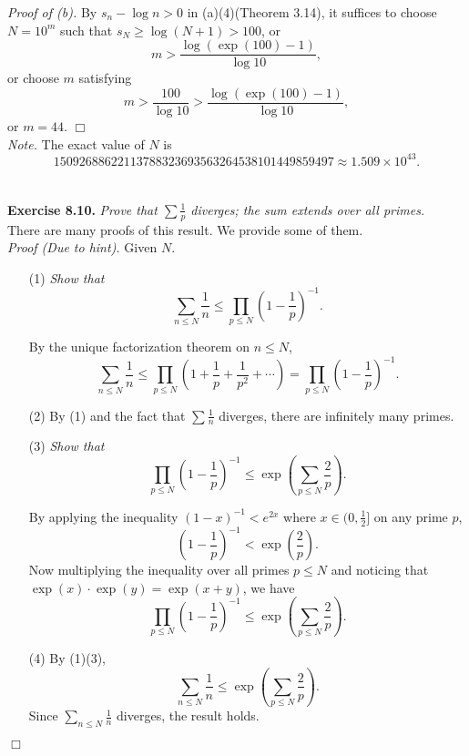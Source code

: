 \documentclass{article}
\begin{document}
\emph{Proof of (b).}
By $s_n - \log n > 0$ in (a)(4)(Theorem 3.14),
it suffices to choose $N = 10^m$ such that
$s_N \geq \log(N+1) > 100$, or
\[
  m > \frac{\log(\exp(100) - 1)}{\log 10},
\]
or choose $m$ satisfying
\[
  m
  > \frac{100}{\log 10}
  > \frac{\log(\exp(100) - 1)}{\log 10},
\]
or $m = 44$.
$\Box$ \\

\emph{Note.}
The exact value of $N$ is
\[
  15092688622113788323693563264538101449859497 \approx 1.509 \times 10^{43}.
\] \\\\






\textbf{Exercise 8.10.}
\emph{Prove that $\sum \frac{1}{p}$ diverges; the sum extends over all primes.} \\

There are many proofs of this result. We provide some of them. \\

\emph{Proof (Due to hint).}
Given $N$.
\begin{enumerate}
\item[(1)]
\emph{Show that
\[
  \sum_{n \leq N} \frac{1}{n}
  \leq \prod_{p \leq N} \left( 1 - \frac{1}{p} \right)^{-1}.
\]}

By the unique factorization theorem on $n \leq N$,
\[
  \sum_{n \leq N} \frac{1}{n}
  \leq \prod_{p \leq N} \left( 1 + \frac{1}{p} + \frac{1}{p^2} + \cdots \right)
  = \prod_{p \leq N} \left( 1 - \frac{1}{p} \right)^{-1}.
\]

\item[(2)]
By (1) and the fact that $\sum \frac{1}{n}$ diverges,
there are infinitely many primes.

\item[(3)]
\emph{Show that
\[
  \prod_{p \leq N} \left( 1 - \frac{1}{p} \right)^{-1}
  \leq \exp \left( \sum_{p \leq N} \frac{2}{p} \right).
\]}

By applying the inequality $(1 - x)^{-1} < e^{2x}$ where $x \in (0, \frac{1}{2}]$
on any prime $p$,
\[
  \left( 1 - \frac{1}{p} \right)^{-1} < \exp \left( \frac{2}{p} \right).
\]
Now multiplying the inequality over all primes $p \leq N$ and noticing that
$\exp(x) \cdot \exp(y) = \exp(x + y)$, we have
\[
  \prod_{p \leq N} \left( 1 - \frac{1}{p} \right)^{-1}
  \leq \exp \left( \sum_{p \leq N} \frac{2}{p} \right).
\]

\item[(4)]
By (1)(3),
\[
  \sum_{n \leq N} \frac{1}{n}
  \leq \exp \left( \sum_{p \leq N} \frac{2}{p} \right).
\]
Since $\sum_{n \leq N} \frac{1}{n}$ diverges, the result holds.
\end{enumerate}
$\Box$ \\
\end{document}

